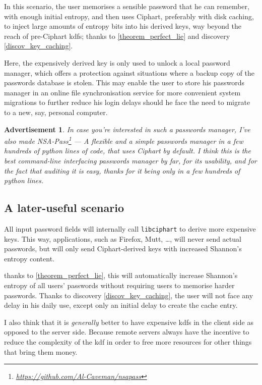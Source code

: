 \documentclass[twocolumn]{article}
\newtheorem{advertisement}{Advertisement}[section]
\begin{document}
In this scenario, the user memorises a sensible password that he can
remember, with enough initial entropy, and then uses Ciphart,
preferably with disk caching, to inject large amounts of entropy bits into
his derived keys, way beyond the reach of pre-Ciphart \glspl{kdf}; thanks
to \cref{theorem_perfect_lie} and discovery \ref{discov_key_caching}.

Here, the expensively derived key is only used to unlock a local password
manager, which offers a protection against situations where a backup copy
of the passwords database is stolen.  This may enable the user to store his
passwords manager in an online file synchronisation service for more
convenient system migrations to further reduce his login delays should he
face the need to migrate to a new, say, personal computer.

\begin{advertisement}
    In case you're interested in such a passwords manager, I've also made
    NSA-Pass\footnote{\url{https://github.com/Al-Caveman/nsapass}}
    --- A flexible and a simple passwords manager in a few hundreds of
    python lines of code, that uses Ciphart by default.  I think
    this is the best command-line interfacing passwords manager by far, for
    its usability, and for the fact that auditing it is easy, thanks for it
    being only in a few hundreds of python lines.
\end{advertisement}

\subsection{A later-useful scenario}
All input password fields will internally call \texttt{libciphart} to
derive more expensive keys.  This way, applications, such as
Firefox, Mutt, \ldots, will never send actual passwords, but
will only send Ciphart-derived keys with increased Shannon's entropy
content.

thanks to \cref{theorem_perfect_lie}, this will automatically
increase Shannon's entropy of all users' passwords without requiring users
to memorise harder passwords.  Thanks to discovery
\ref{discov_key_caching}, the user will not face any delay in his daily
use, except only an initial delay to create the cache entry.

I also think that it is \emph{generally} better to have expensive
\glspl{kdf} in the client side as opposed to the server side.
Because remote servers always have the incentive to reduce the complexity
of the \gls{kdf} in order to free more resources for other
things that bring them money.
\end{document}
